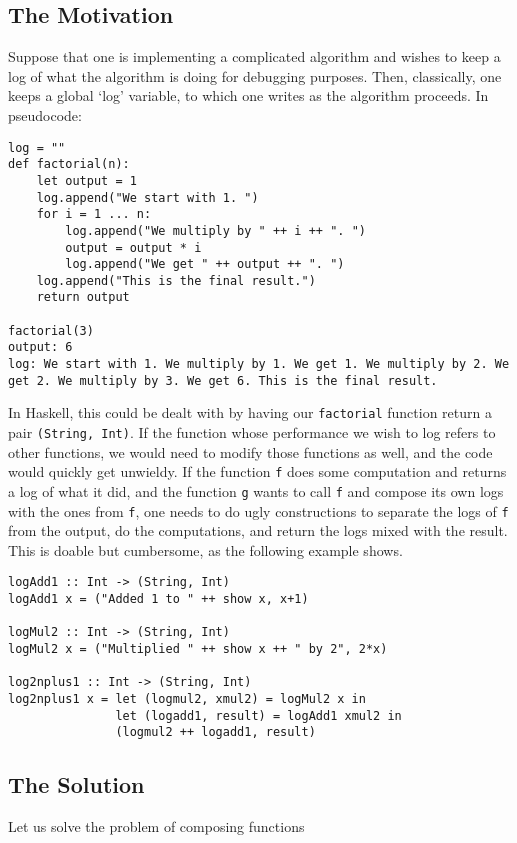 \documentclass[11pt]{article}
\theoremstyle{nonumberplain}
\newcommand*\lsin{\lstinline}
\begin{document}
\subsection{The Motivation}

Suppose that one is implementing a complicated algorithm and wishes to keep a log of what the algorithm is doing for debugging purposes. Then, classically, one keeps a global `log' variable, to which one writes as the algorithm proceeds. In pseudocode:
\begin{lstlisting}
log = ""
def factorial(n):
	let output = 1
	log.append("We start with 1. ")
	for i = 1 ... n:
		log.append("We multiply by " ++ i ++ ". ")
		output = output * i
		log.append("We get " ++ output ++ ". ")
	log.append("This is the final result.")
	return output

factorial(3)
output: 6
log: We start with 1. We multiply by 1. We get 1. We multiply by 2. We get 2. We multiply by 3. We get 6. This is the final result.
\end{lstlisting}

In Haskell, this could be dealt with by having our \lsin|factorial| function return a pair \lsin|(String, Int)|. If the function whose performance we wish to log refers to other functions, we would need to modify those functions as well, and the code would quickly get unwieldy. If the function \lsin|f| does some computation and returns a log of what it did, and the function \lsin|g| wants to call \lsin|f| and compose its own logs with the ones from \lsin|f|, one needs to do ugly constructions to separate the logs of \lsin|f| from the output, do the computations, and return the logs mixed with the result. This is doable but cumbersome, as the following example shows.
\begin{lstlisting}
logAdd1 :: Int -> (String, Int)
logAdd1 x = ("Added 1 to " ++ show x, x+1)

logMul2 :: Int -> (String, Int)
logMul2 x = ("Multiplied " ++ show x ++ " by 2", 2*x)

log2nplus1 :: Int -> (String, Int)
log2nplus1 x = let (logmul2, xmul2) = logMul2 x in
               let (logadd1, result) = logAdd1 xmul2 in
               (logmul2 ++ logadd1, result)
\end{lstlisting}

\subsection{The Solution}

Let us solve the problem of composing functions 
\end{document}
